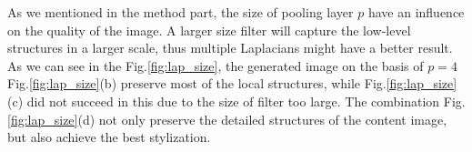 \documentclass[runningheads]{llncs}
\begin{document}
As we mentioned in the method part, the size of pooling layer $p$ have an influence on the quality of the image. A larger size filter will capture the low-level structures in a larger scale, thus multiple Laplacians might have a better result. As we can see in the Fig.\ref{fig:lap_size}, the generated image on the basis of $p=4$ Fig.\ref{fig:lap_size}(b) preserve most of the local structures, while Fig.\ref{fig:lap_size}(c) did not succeed in this due to the size of filter too large. The combination Fig.\ref{fig:lap_size}(d) not only preserve the detailed structures of the content image, but also achieve the best stylization.  
\begin{figure}[h!]
\centering 
{}
\hspace{0.01\linewidth}
\vfill
{}
\hspace{0.01\linewidth}

\end{figure}
\end{document}
